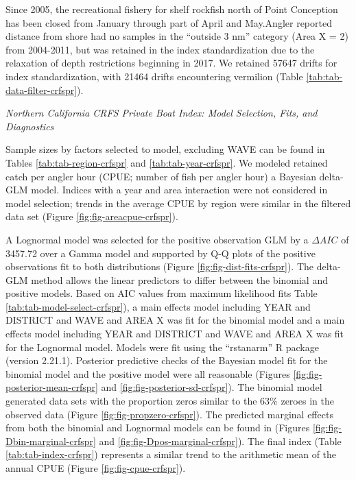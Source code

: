 \documentclass[11pt,
  english,
]{article}
\begin{document}
Since 2005, the recreational fishery for shelf rockfish north of Point Conception has been closed from January through part of April and May.Angler reported distance from shore had no samples in the ``outside 3 nm'' category (Area X = 2) from 2004-2011, but was retained in the index standardization due to the relaxation of depth restrictions beginning in 2017. We retained 57647 drifts for index standardization, with 21464 drifts encountering vermilion (Table \ref{tab:tab-data-filter-crfspr}).

\emph{Northern California CRFS Private Boat Index: Model Selection, Fits, and Diagnostics}

Sample sizes by factors selected to model, excluding WAVE can be found in Tables \ref{tab:tab-region-crfspr} and \ref{tab:tab-year-crfspr}. We modeled retained catch per angler hour (CPUE; number of fish per angler hour) a Bayesian delta-GLM model. Indices with a year and area interaction were not considered in model selection; trends in the average CPUE by region were similar in the filtered data set (Figure \ref{fig:fig-areacpue-crfspr}).

A Lognormal model was selected for the positive observation GLM by a {\(\Delta AIC\)\leavevmode\tagmcend\tagstructend} of 3457.72 over a Gamma model and supported by Q-Q plots of the positive observations fit to both distributions (Figure \ref{fig:fig-dist-fits-crfspr}). The delta-GLM method allows the linear predictors to differ between the binomial and positive models. Based on AIC values from maximum likelihood fits Table \ref{tab:tab-model-select-crfspr}), a main effects model including YEAR and DISTRICT and WAVE and AREA X was fit for the binomial model and a main effects model including YEAR and DISTRICT and WAVE and AREA X was fit for the Lognormal model. Models were fit using the ``rstanarm'' R package (version 2.21.1). Posterior predictive checks of the Bayesian model fit for the binomial model and the positive model were all reasonable (Figures \ref{fig:fig-posterior-mean-crfspr} and \ref{fig:fig-posterior-sd-crfspr}). The binomial model generated data sets with the proportion zeros similar to the 63\% zeroes in the observed data (Figure \ref{fig:fig-propzero-crfspr}). The predicted marginal effects from both the binomial and Lognormal models can be found in (Figures \ref{fig:fig-Dbin-marginal-crfspr} and \ref{fig:fig-Dpos-marginal-crfspr}). The final index (Table \ref{tab:tab-index-crfspr}) represents a similar trend to the arithmetic mean of the annual CPUE (Figure \ref{fig:fig-cpue-crfspr}).
\end{document}
